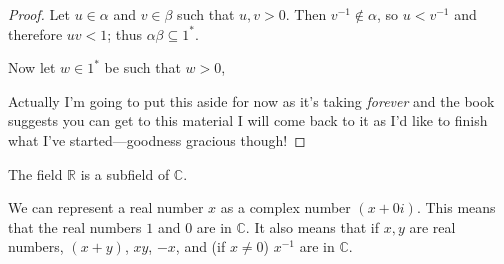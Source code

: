 \documentclass[12pt]{article}
\begin{document}
\begin{thm}
\begin{proof}
    Let $u \in \alpha$ and $v \in \beta$ such that $u,v > 0$. Then $v^{-1} \notin
    \alpha$, so $u < v^{-1}$ and therefore $uv < 1$; thus $\alpha\beta \subseteq
    1^*$.

    Now let $w \in 1^*$ be such that $w > 0$,

    Actually I'm going to put this aside for now as it's taking \textit{forever} and
    the book suggests you can get to this material  I will come back to it as I'd like to finish what I've started—goodness
    gracious though!
  \end{proof}
\end{thm}

\begin{exm}
  The field $\mathbb{R}$ is a subfield of $\mathbb{C}$.

  We can represent a real number $x$ as a complex number $(x +
  0i)$. This means that the real numbers $1$ and $0$ are in
  $\mathbb{C}$. It also means that if $x, y$ are real numbers,
  $(x + y)$, $xy$, $-x$, and (if $x \neq 0$) $x^{-1}$ are in
  $\mathbb{C}$.
\end{exm}
\end{document}
